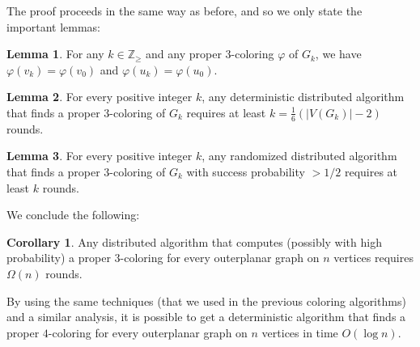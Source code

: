 \documentclass{article}
\theoremstyle{definition}
\newtheorem{corollary}{Corollary}[section]
\newtheorem{lemma}{Lemma}[section]
\def \Z {{\mathbb Z}}
\begin{document}

The proof proceeds in the same way as before, and so we only state the important lemmas:

\begin{lemma} For any $k \in \Z_{\ge}$ and any proper $3$-coloring $\varphi$ of $G_k$, we have $\varphi(v_k) = \varphi(v_0)$ and $\varphi(u_k) = \varphi(u_0)$.\label{lem:distanceColorOuterplanar}\end{lemma}



\begin{lemma} For every positive integer $k$, any deterministic distributed algorithm that finds a proper $3$-coloring of $G_k$ requires at least $k = \frac{1}{6}(|V(G_k)|-2)$ rounds.\label{lem:lowerBoundDet3}\end{lemma}

\begin{lemma} For every positive integer $k$, any randomized distributed algorithm that finds a proper $3$-coloring of $G_k$ with success probability $>1/2$ requires at least $k$ rounds.\label{lem:lowerBoundRand3}\end{lemma}

We conclude the following:

\begin{corollary} Any distributed algorithm that computes (possibly with high probability) a proper $3$-coloring for every outerplanar graph on $n$ vertices requires $\Omega(n)$ rounds. \label{col:lowerBound3Col}\end{corollary}

By using the same techniques (that we used in the previous coloring algorithms) and a similar analysis, it is possible to get a deterministic algorithm that finds a proper $4$-coloring for every outerplanar graph on $n$ vertices in time $O(\log{n})$.



\end{document}
